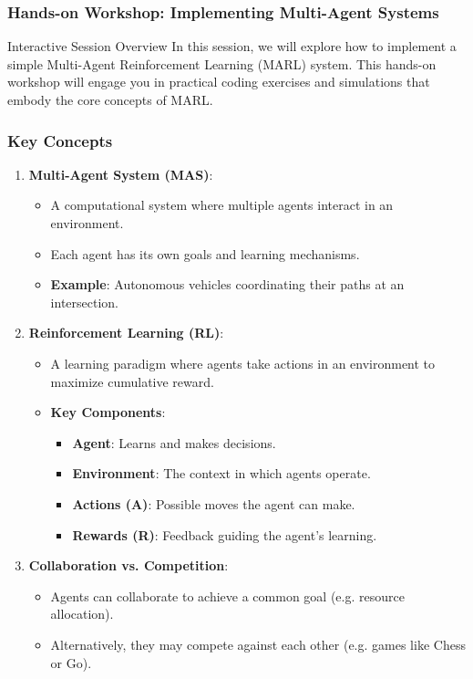 \documentclass[aspectratio=169]{beamer}
\begin{document}
\begin{frame}[fragile]
    \frametitle{Hands-on Workshop: Implementing Multi-Agent Systems}
    
    \begin{block}{Interactive Session Overview}
        In this session, we will explore how to implement a simple Multi-Agent Reinforcement Learning (MARL) system. This hands-on workshop will engage you in practical coding exercises and simulations that embody the core concepts of MARL.
    \end{block}
\end{frame}

\begin{frame}[fragile]
    \frametitle{Key Concepts}
    
    \begin{enumerate}
        \item \textbf{Multi-Agent System (MAS)}:
            \begin{itemize}
                \item A computational system where multiple agents interact in an environment.
                \item Each agent has its own goals and learning mechanisms.
                \item \textbf{Example}: Autonomous vehicles coordinating their paths at an intersection.
            \end{itemize}
        
        \item \textbf{Reinforcement Learning (RL)}:
            \begin{itemize}
                \item A learning paradigm where agents take actions in an environment to maximize cumulative reward.
                \item \textbf{Key Components}:
                    \begin{itemize}
                        \item \textbf{Agent}: Learns and makes decisions.
                        \item \textbf{Environment}: The context in which agents operate.
                        \item \textbf{Actions (A)}: Possible moves the agent can make.
                        \item \textbf{Rewards (R)}: Feedback guiding the agent's learning.
                    \end{itemize}
            \end{itemize}
        
        \item \textbf{Collaboration vs. Competition}:
            \begin{itemize}
                \item Agents can collaborate to achieve a common goal (e.g. resource allocation).
                \item Alternatively, they may compete against each other (e.g. games like Chess or Go).
            \end{itemize}
    \end{enumerate}
\end{frame}
\end{document}
